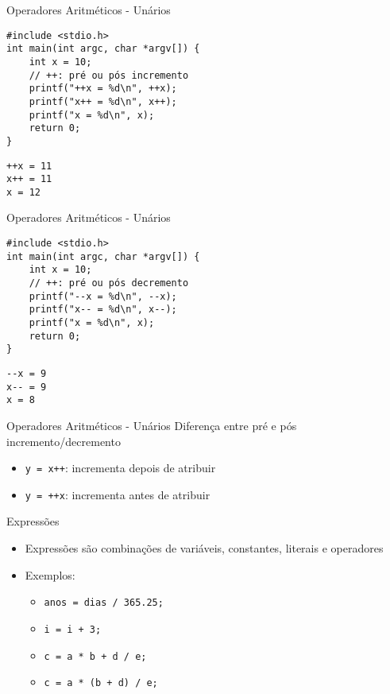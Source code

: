 \documentclass[t, aspectratio=169]{beamer}
\begin{document}
\begin{frame}[label={sec:org35509df},fragile]{Operadores Aritméticos - Unários}
 \vspace{-0.5cm}
\begin{verbatim}
#include <stdio.h>
int main(int argc, char *argv[]) {
    int x = 10;
    // ++: pré ou pós incremento
    printf("++x = %d\n", ++x);
    printf("x++ = %d\n", x++);
    printf("x = %d\n", x);
    return 0;
}
\end{verbatim}

\begin{verbatim}
++x = 11
x++ = 11
x = 12
\end{verbatim}
\end{frame}

\begin{frame}[label={sec:org6f76921},fragile]{Operadores Aritméticos - Unários}
 \vspace{-0.5cm}
\begin{verbatim}
#include <stdio.h>
int main(int argc, char *argv[]) {
    int x = 10;
    // ++: pré ou pós decremento
    printf("--x = %d\n", --x);
    printf("x-- = %d\n", x--);
    printf("x = %d\n", x);
    return 0;
}
\end{verbatim}

\begin{verbatim}
--x = 9
x-- = 9
x = 8
\end{verbatim}
\end{frame}

\begin{frame}[label={sec:org089e073},fragile]{Operadores Aritméticos - Unários}
 Diferença entre pré e pós incremento/decremento
\begin{itemize}
\item \texttt{y = x++}: incrementa depois de atribuir
\item \texttt{y = ++x}: incrementa antes de atribuir
\end{itemize}
\end{frame}

\begin{frame}[label={sec:org0e8aa0c},fragile]{Expressões}
 \begin{itemize}
\item Expressões são combinações de variáveis, constantes, literais e operadores
\item Exemplos:
\begin{itemize}
\item \texttt{anos = dias / 365.25;}
\item \texttt{i = i + 3;}
\item \texttt{c = a * b + d / e;}
\item \texttt{c = a * (b + d) / e;}
\end{itemize}
\end{itemize}
\end{frame}
\end{document}
